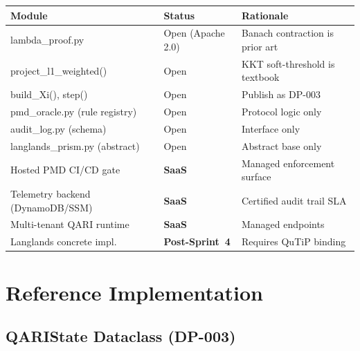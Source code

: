 \documentclass[12pt,letterpaper]{article}
\begin{document}
\begin{center}
\begin{longtable}{>{\ttfamily}lll}
  \toprule
  \normalfont\textbf{Module} & \textbf{Status} & \textbf{Rationale} \\
  \midrule
  lambda\_proof.py & Open (Apache 2.0) & Banach contraction is prior art \\
  project\_l1\_weighted() & Open & KKT soft-threshold is textbook \\
  build\_Xi(), step() & Open & Publish as DP-003 \\
  pmd\_oracle.py (rule registry) & Open & Protocol logic only \\
  audit\_log.py (schema) & Open & Interface only \\
  langlands\_prism.py (abstract) & Open & Abstract base only \\
  \midrule
  Hosted PMD CI/CD gate & \textbf{SaaS} & Managed enforcement surface \\
  Telemetry backend (DynamoDB/SSM) & \textbf{SaaS} & Certified audit trail SLA \\
  Multi-tenant QARI runtime & \textbf{SaaS} & Managed endpoints \\
  Langlands concrete impl. & \textbf{Post-Sprint~4} & Requires QuTiP binding \\
  \bottomrule
\end{longtable}
\end{center}

\section{Reference Implementation}

\subsection{QARIState Dataclass (DP-003)}
\end{document}
